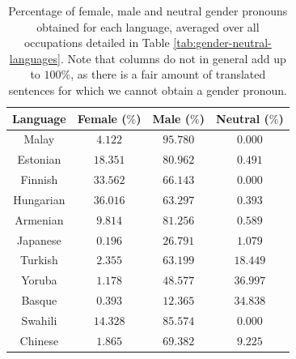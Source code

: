 \documentclass[fleqn,10pt]{article}
\begin{document}
\begin{table}[H]
\small{
	\centering
	\begin{tabular}{|c|c|c|c|}
	\hline
	Language 	& Female ($\%$) 	& Male ($\%$)		& Neutral ($\%$)	\\ \hline
	\hline
	Malay     	& $4.122$ 			& $95.780$  		& $0.000$			\\ \hline
	Estonian  	& $18.351$			& $80.962$  		& $0.491$			\\ \hline
	Finnish   	& $33.562$			& $66.143$  		& $0.000$			\\ \hline
	Hungarian 	& $36.016$			& $63.297$  		& $0.393$			\\ \hline
	Armenian  	& $9.814$			& $81.256$  		& $0.589$			\\ \hline
	Japanese  	& $0.196$			& $26.791$  		& $1.079$			\\ \hline
	Turkish   	& $2.355$			& $63.199$  		& $18.449$			\\ \hline
	Yoruba    	& $1.178$			& $48.577$  		& $36.997$			\\ \hline
	Basque    	& $0.393$			& $12.365$  		& $34.838$			\\ \hline
	Swahili   	& $14.328$ 			& $85.574$  		& $0.000$			\\ \hline
	Chinese   	& $1.865$ 			& $69.382$  		& $9.225$			\\ \hline
	\end{tabular}
	\caption{Percentage of female, male and neutral gender pronouns obtained for each language, averaged over all occupations detailed in Table \ref{tab:gender-neutral-languages}. Note that columns do not in general add up to $100\%$, as there is a fair amount of translated sentences for which we cannot obtain a gender pronoun.}
	\label{tab:gender-by-language}
	}
\end{table}
\end{document}
